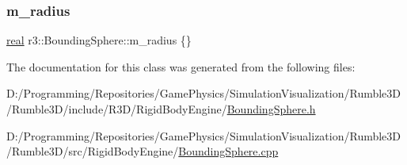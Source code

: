\subsubsection{\texorpdfstring{m\+\_\+radius}{m\_radius}}
{\footnotesize\ttfamily \mbox{\hyperlink{namespacer3_ab2016b3e3f743fb735afce242f0dc1eb}{real}} r3\+::\+Bounding\+Sphere\+::m\+\_\+radius \{\}\hspace{0.3cm}{\ttfamily [protected]}}



The documentation for this class was generated from the following files\+:\begin{DoxyCompactItemize}
\item 
D\+:/\+Programming/\+Repositories/\+Game\+Physics/\+Simulation\+Visualization/\+Rumble3\+D/\+Rumble3\+D/include/\+R3\+D/\+Rigid\+Body\+Engine/\mbox{\hyperlink{_bounding_sphere_8h}{Bounding\+Sphere.\+h}}\item 
D\+:/\+Programming/\+Repositories/\+Game\+Physics/\+Simulation\+Visualization/\+Rumble3\+D/\+Rumble3\+D/src/\+Rigid\+Body\+Engine/\mbox{\hyperlink{_bounding_sphere_8cpp}{Bounding\+Sphere.\+cpp}}\end{DoxyCompactItemize}
